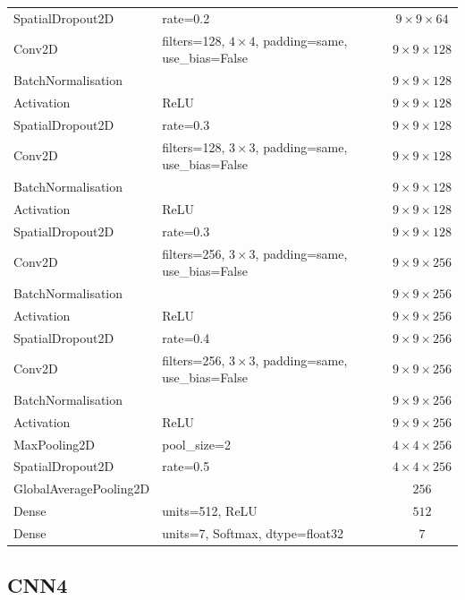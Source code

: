 \documentclass[12pt, a4paper]{report}
\let\oldsubsection\subsection
\renewcommand{\subsection}{%
    \Needspace{6\baselineskip}%
    \oldsubsection
}
\begin{document}
\begin{longtable}{lp{6cm}c}
					SpatialDropout2D & rate=0.2 & $9\times9\times64$ \\
					Conv2D & filters=128, $4\times4$, padding=same, use\_bias=False & $9\times9\times128$ \\
					BatchNormalisation &  & $9\times9\times128$ \\
					Activation & ReLU & $9\times9\times128$ \\
					SpatialDropout2D & rate=0.3 & $9\times9\times128$ \\
					Conv2D & filters=128, $3\times3$, padding=same, use\_bias=False & $9\times9\times128$ \\
					BatchNormalisation &  & $9\times9\times128$ \\
					Activation & ReLU & $9\times9\times128$ \\
					SpatialDropout2D & rate=0.3 & $9\times9\times128$ \\
					Conv2D & filters=256, $3\times3$, padding=same, use\_bias=False & $9\times9\times256$ \\
					BatchNormalisation &  & $9\times9\times256$ \\
					Activation & ReLU & $9\times9\times256$ \\
					SpatialDropout2D & rate=0.4 & $9\times9\times256$ \\
					Conv2D & filters=256, $3\times3$, padding=same, use\_bias=False & $9\times9\times256$ \\
					BatchNormalisation &  & $9\times9\times256$ \\
					Activation & ReLU & $9\times9\times256$ \\
					MaxPooling2D & pool\_size=2 & $4\times4\times256$ \\
					SpatialDropout2D & rate=0.5 & $4\times4\times256$ \\
					GlobalAveragePooling2D &  & $256$ \\
					Dense & units=512, ReLU & $512$ \\
					Dense & units=7, Softmax, dtype=float32 & $7$ \\
				\end{longtable}
			
			\subsection{CNN4}
			
\end{document}
